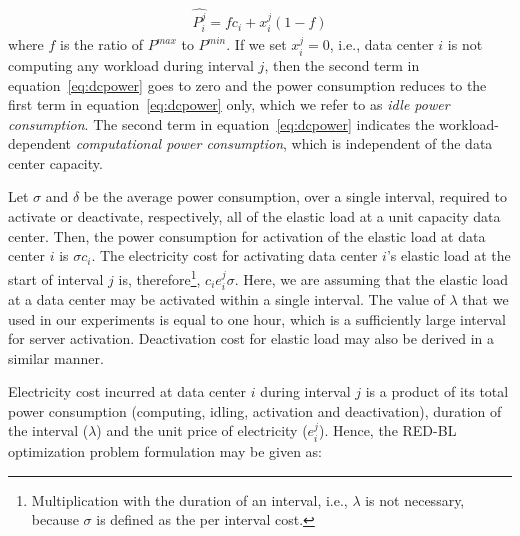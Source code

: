 \begin{align}
\label{eq:dcpower}
\hat{P_i^j} = fc_i + x_i^j\left(1-f\right)
\end{align}
where $f$ is the ratio of $P^{max}$ to $P^{min}$. If we set $x_i^j=0$, i.e., data center $i$ is not computing any workload during interval $j$, then the second term in equation~\ref{eq:dcpower} goes to zero and the power consumption reduces to the first term in equation~\ref{eq:dcpower} only, which we refer to as \textit{idle power consumption}. The second term in equation~\ref{eq:dcpower} indicates the workload-dependent \textit{computational power consumption}, which is independent of the data center capacity.

Let $\sigma$ and $\delta$ be the average power consumption, over a single interval, required to activate or deactivate, respectively, all of the elastic load at a unit capacity data center. Then, the power consumption for activation of the elastic load at data center $i$ is $\sigma c_i$. The electricity cost for activating data center $i$'s elastic load at the start of interval $j$ is, therefore\footnote{Multiplication with the duration of an interval, i.e., $\lambda$ is not necessary, because $\sigma$ is defined as the per interval cost.}, $c_ie_i^j\sigma$. Here, we are assuming that the elastic load at a data center may be activated within a single interval. The value of $\lambda$ that we used in our experiments is equal to one hour, which is a sufficiently large interval for server activation. Deactivation cost for elastic load may also be derived in a similar manner. 

Electricity cost incurred at data center $i$ during interval $j$ is a product of its total power consumption (computing, idling, activation and deactivation), duration of the interval ($\lambda$) and the unit price of electricity ($e_i^j$). Hence, the RED-BL optimization problem formulation may be given as:

